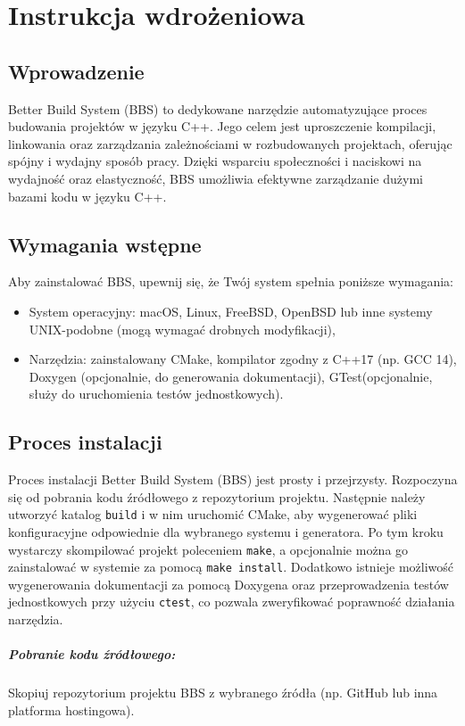 \chapter{Instrukcja wdrożeniowa}

\section{Wprowadzenie}
Better Build System (BBS) to dedykowane narzędzie automatyzujące proces budowania projektów w języku C++. Jego celem jest uproszczenie kompilacji, linkowania oraz zarządzania zależnościami w rozbudowanych projektach, oferując spójny i wydajny sposób pracy. Dzięki wsparciu społeczności i naciskowi na wydajność oraz elastyczność, BBS umożliwia efektywne zarządzanie dużymi bazami kodu w języku C++.

\section{Wymagania wstępne}
Aby zainstalować BBS, upewnij się, że Twój system spełnia poniższe wymagania:
\begin{itemize}
    \item System operacyjny: macOS, Linux, FreeBSD, OpenBSD lub inne systemy UNIX-podobne (mogą wymagać drobnych modyfikacji),
    \item Narzędzia: zainstalowany CMake, kompilator zgodny z C++17 (np. GCC 14), Doxygen (opcjonalnie, do generowania dokumentacji), GTest(opcjonalnie, służy do uruchomienia testów jednostkowych).
\end{itemize}

\section{Proces instalacji}
Proces instalacji Better Build System (BBS) jest prosty i przejrzysty. Rozpoczyna się od pobrania kodu źródłowego z repozytorium projektu. Następnie należy utworzyć katalog \texttt{build} i w nim uruchomić CMake, aby wygenerować pliki konfiguracyjne odpowiednie dla wybranego systemu i generatora. Po tym kroku wystarczy skompilować projekt poleceniem \texttt{make}, a opcjonalnie można go zainstalować w systemie za pomocą \texttt{make install}. Dodatkowo istnieje możliwość wygenerowania dokumentacji za pomocą Doxygena oraz przeprowadzenia testów jednostkowych przy użyciu \texttt{ctest}, co pozwala zweryfikować poprawność działania narzędzia.

\paragraph{Pobranie kodu źródłowego:} 
Skopiuj repozytorium projektu BBS z wybranego źródła (np. GitHub lub inna platforma hostingowa).

